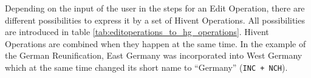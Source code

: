 

\vspace{-1.0em}

Depending on the input of the user in the steps for an Edit Operation, there are different possibilities to express it by a set of Hivent Operations. All possibilities are introduced in table \ref{tab:editoperations_to_hg_operations}. Hivent Operations are combined when they happen at the same time. In the example of the German Reunification, East Germany was incorporated into West Germany which at the same time changed its short name to ``Germany'' (\texttt{INC + NCH}).

